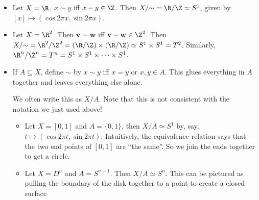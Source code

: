 \documentclass[a4paper]{article}
\begin{document}
\begin{eg}\leavevmode
  \begin{itemize}
    \item Let $X = \R$, $x\sim y$ iff $x - y\in \Z$. Then $X/{\sim} = \R/\Z \simeq S^1$, given by $[x] \mapsto (\cos 2\pi x, \sin 2\pi x)$.
    \item Let $X = \R^2$. Then $\mathbf{v}\sim \mathbf{w}$ iff $\mathbf{v} - \mathbf{w} \in \Z^2$. Then $X/{\sim} = \R^2/\Z^2 = (\R/\Z)\times (\R/\Z) \simeq S^1\times S^1 = T^2$. Similarly, $\R^n/\Z^n = T^n = S^1\times S^1 \times \cdots \times S^1$.
    \item If $A\subseteq X$, define $\sim$ by $x\sim y$ iff $x = y$ or $x, y\in A$. This glues everything in $A$ together and leaves everything else alone.

      We often write this as $X/A$. Note that this is not consistent with the notation we just used above!
      \begin{itemize}
        \item Let $X = [0, 1]$ and $A = \{0, 1\}$, then $X/A \simeq S^1$ by, say, $t\mapsto (\cos 2\pi t, \sin 2\pi t)$. Intuitively, the equivalence relation says that the two end points of $[0, 1]$ are ``the same''. So we join the ends together to get a circle.
          \begin{center}
          \end{center}

        \item Let $X = D^n$ and $A = S^{n - 1}$. Then $X/A \simeq S^n$. This can be pictured as pulling the boundary of the disk together to a point to create a closed surface
          \begin{center}
\end{center}
\end{itemize}
\end{itemize}
\end{eg}
\end{document}
